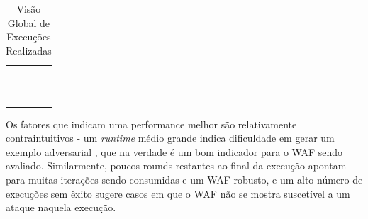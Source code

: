 \begin{table}[H]
\centering
\caption{Visão Global de Execuções Realizadas}
\begin{supertabular}{m{4.0cm}m{3.7cm}m{3.6cm}m{3.0cm}}
\hline
{} &
 &
 &
\centering{}\\\hline
{} &
 &
 &
\centering{}\\
 &
 &
 &
\centering{}\\
 &
 &
 &
\centering{}\\
 &
 &
 &
\centering{}\\
 &
 &
 &
\centering{}\\
 &
 &
 &
\centering{}\\
 &
 &
 &
\centering{}\\
 &
 &
 &
\centering{}\\
 &
 &
 &
\centering{}\\
 &
 &
 &
\centering{}\\
 &
 &
 &
\centering{}\\
\hline
\end{supertabular}
    \label{tab:tests}
\end{table}
\bigskip

Os fatores que indicam uma performance melhor são relativamente contraintuitivos - um \textit{runtime} médio grande indica dificuldade em gerar um exemplo adversarial \cite{adversarial_example}, que na verdade é um bom indicador para o WAF sendo avaliado. Similarmente, poucos rounds restantes ao final da execução apontam para muitas iterações sendo consumidas e um WAF robusto, e um alto número de execuções sem êxito sugere casos em que o WAF não se mostra suscetível a um ataque naquela execução. 

